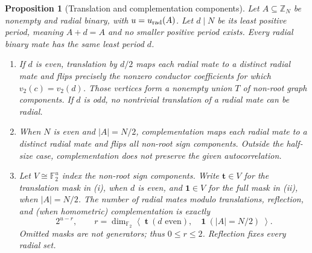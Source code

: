 \documentclass[11pt]{article}
\numberwithin{equation}{section}
\newtheorem{proposition}[theorem]{Proposition}
\theoremstyle{definition}
\theoremstyle{remark}
\begin{document}
\begin{proposition}[Translation and complementation components]\label{ii:prop:symmetries}
Let $A\subseteq\mathbb Z_N$ be nonempty and radial binary, with $u=u_{\rm rad}(A)$.  Let $d\mid N$ be its \emph{least positive period}, meaning $A+d=A$ and no smaller positive period exists.  Every radial binary mate has the same least period $d$.

\begin{enumerate}[label=(\roman*),nosep]
\item If $d$ is even, translation by $d/2$ maps each radial mate to a distinct radial mate and flips precisely the nonzero conductor coefficients for which $v_2(c)=v_2(d)$.  Those vertices form a nonempty union $T$ of non-root graph components.  If $d$ is odd, no nontrivial translation of a radial mate can be radial.
\item When $N$ is even and $|A|=N/2$, complementation maps each radial mate to a distinct radial mate and flips \emph{all} non-root sign components.  Outside the half-size case, complementation does not preserve the given autocorrelation.
\item Let $V\cong\mathbb F_2^u$ index the non-root sign components.  Write $\mathbf t\in V$ for the translation mask in (i), when $d$ is even, and $\mathbf1\in V$ for the full mask in (ii), when $|A|=N/2$.  The number of radial mates modulo translations, reflection, and (when homometric) complementation is exactly
\begin{equation}\label{ii:eq:orbitcount}
 2^{u-r},\qquad r=\dim_{\mathbb F_2}\left\langle\;\mathbf t\ (d\text{ even}),\quad\mathbf1\ (|A|=N/2)\;\right\rangle.
\end{equation}
Omitted masks are not generators; thus $0\le r\le2$.  Reflection fixes every radial set.
\end{enumerate}
\end{proposition}
\end{document}
